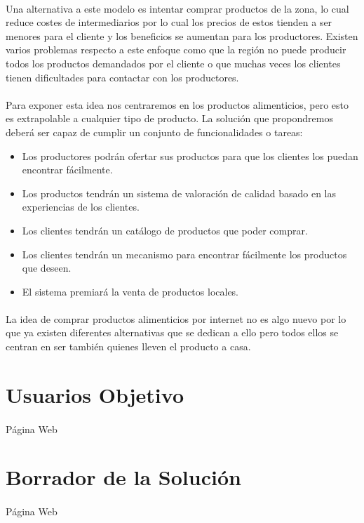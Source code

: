 \documentclass[10pt, a4paper,spanish]{article}
\begin{document}
			\paragraph{}
			Una alternativa a este modelo es intentar comprar productos de la zona, lo cual reduce costes de intermediarios por lo cual los precios de estos tienden a ser menores para el cliente y los beneficios se aumentan para los productores. Existen varios problemas respecto a este enfoque como que la región no puede producir todos los productos demandados por el cliente o que muchas veces los clientes tienen dificultades para contactar con los productores.
			
			\paragraph{}
			Para exponer esta idea nos centraremos en los productos alimenticios, pero esto es extrapolable a cualquier tipo de producto. La solución que propondremos deberá ser capaz de cumplir un conjunto de funcionalidades o tareas:
			\begin{itemize}
				\item Los productores podrán ofertar sus productos para que los clientes los puedan encontrar fácilmente.
				\item Los productos tendrán un sistema de valoración de calidad basado en las experiencias de los clientes.
				\item Los clientes tendrán un catálogo de productos que poder comprar.
				\item Los clientes tendrán un mecanismo para encontrar fácilmente los productos que deseen.
				\item El sistema premiará la venta de productos locales.
			\end{itemize}
			
			\paragraph{}
			La idea de comprar productos alimenticios por internet no es algo nuevo por lo que ya existen diferentes alternativas que se dedican a ello pero todos ellos se centran en ser también quienes lleven el producto a casa.
			
		\section{Usuarios Objetivo}
		
			\paragraph{}
			Página Web

		\section{Borrador de la Solución}
		
			\paragraph{}
			Página Web
\end{document}

